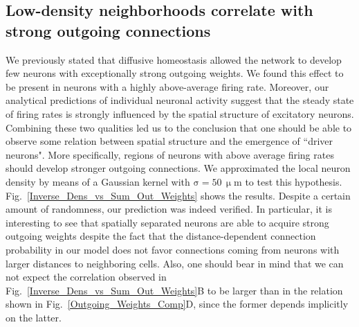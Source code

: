 \documentclass[10pt,letterpaper]{article}
\begin{document}
\subsection*{Low-density neighborhoods correlate with strong outgoing connections}
We previously stated that diffusive homeostasis allowed the network to develop few neurons with exceptionally strong outgoing weights. We found this effect to be present in neurons with a highly above-average firing rate. Moreover, our analytical predictions of individual neuronal activity suggest that the steady state of firing rates is strongly influenced by the spatial structure of excitatory neurons. Combining these two qualities led us to the conclusion that one should be able to observe some relation between spatial structure and the emergence of ``driver neurons". More specifically, regions of neurons with above average firing rates should develop stronger outgoing connections. We approximated the local neuron density by means of a Gaussian kernel with $\mathrm{\sigma = 50\, \upmu m}$ to test this hypothesis. Fig.~\ref{Inverse_Dens_vs_Sum_Out_Weights} shows the results. Despite a certain amount of randomness, our prediction was indeed verified. In particular, it is interesting to see that spatially separated neurons are able to acquire strong outgoing weights despite the fact that the distance-dependent connection probability in our model does not favor connections coming from neurons with larger distances to neighboring cells. Also, one should bear in mind that we can not expect the correlation observed in Fig.~\ref{Inverse_Dens_vs_Sum_Out_Weights}B to be larger than in the relation shown in Fig.~\ref{Outgoing_Weights_Comp}D, since the former depends implicitly on the latter.
\end{document}
